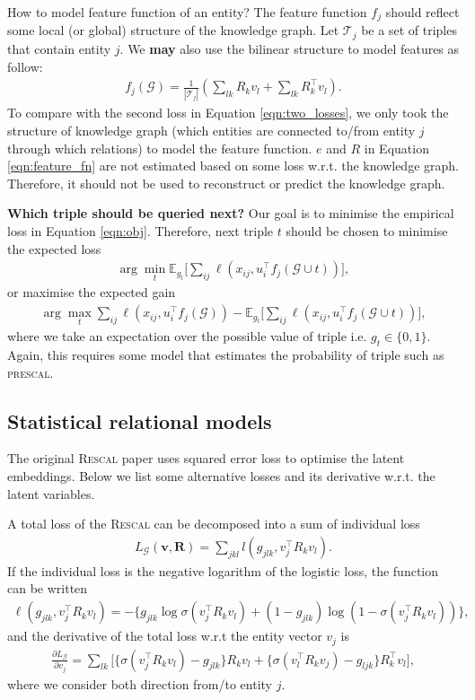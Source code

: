 \documentclass{article} %
\theoremstyle{definition}
\begin{document}
How to model feature function of an entity? The feature function $f_j$ should reflect some local (or global) structure of the knowledge graph.  Let $\mathcal{T}_j$ be a set of triples that contain entity $j$. We \textbf{may} also use the bilinear structure to model features as follow:
\begin{align}
\label{eqn:feature_fn}
f_j(\mathcal{G}) = \frac{1}{|\mathcal{T}_j|} ( \sum_{lk} R_k v_{l} + \sum_{lk}R_k^\top v_{l} ).
\end{align}
To compare with the second loss in Equation \ref{eqn:two_losses}, we only took the structure of knowledge graph (which entities are connected to/from entity $j$ through which relations) to model the feature function. $e$ and $R$ in Equation \ref{eqn:feature_fn} are not estimated based on some loss w.r.t. the knowledge graph. Therefore, it should not be used to reconstruct or predict the knowledge graph.

\textbf{Which triple should be queried next?} Our goal is to minimise the empirical loss in Equation \ref{eqn:obj}. Therefore, next triple $t$ should be chosen to minimise the expected loss
\begin{align}
\arg\min_t \mathbb{E}_{g_t}\bigg[\sum_{ij}\ell(x_{ij}, u_{i}^\top  f_j(\mathcal{G} \cup t))\bigg],
\end{align}
or maximise the expected gain
\begin{align}
\arg\max_t \sum_{ij}\ell(x_{ij}, u_{i}^\top  f_j(\mathcal{G})) - \mathbb{E}_{g_t}\bigg[\sum_{ij}\ell(x_{ij}, u_{i}^\top  f_j(\mathcal{G} \cup t))\bigg],
\end{align}
where we take an expectation over the possible value of triple i.e. $g_t \in \{0, 1\}$. Again, this requires some model that estimates the probability of triple such as \textsc{prescal}.

\subsection{Statistical relational models}
The original \textsc{Rescal} paper uses squared error loss to optimise the latent embeddings. Below we list some alternative losses and its derivative w.r.t. the latent variables.

A total loss of the \textsc{Rescal} can be decomposed into a sum of individual loss
\begin{align}
L_\mathcal{G}(\mathbf{v}, \mathbf{R}) = \sum_{jkl} l(g_{jlk}, v_j^\top R_k v_l).
\end{align}
If the individual loss is the negative logarithm of the logistic loss, the function can be written
\begin{align}
\ell(g_{jlk}, v_j^\top R_k v_l) = - \bigg\{g_{jlk} \log \sigma(v_j^\top R_k v_l) + (1- g_{jlk}) \log (1- \sigma(v_j^\top R_k v_l))\bigg\},
\end{align}
and the derivative of the total loss w.r.t the entity vector $v_j$ is
\begin{align}
\frac{\partial L_\mathcal{G}}{\partial v_j} =  \sum_{lk}\bigg[\Big\{\sigma(v_j^\top R_k v_l) - g_{jlk}\Big\} R_k v_l + \Big\{\sigma(v_l^\top R_k v_j) - g_{ljk}\Big\} R_k^\top v_l \bigg],
\end{align}
where we consider both direction from/to entity $j$.
\end{document}
